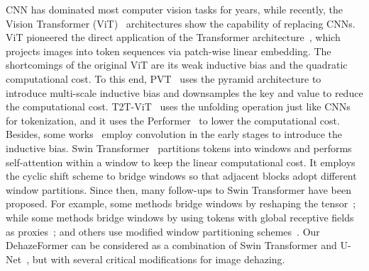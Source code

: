 \documentclass[journal]{IEEEtran}
\begin{document}
CNN has dominated most computer vision tasks for years, while recently, the Vision Transformer (ViT)~\cite{dosovitskiy2020image} architectures show the capability of replacing CNNs.
ViT pioneered the direct application of the Transformer architecture~\cite{vaswani2017attention}, which projects images into token sequences via patch-wise linear embedding.
The shortcomings of the original ViT are its weak inductive bias and the quadratic computational cost.
To this end, PVT~\cite{wang2021pyramid} uses the pyramid architecture to introduce multi-scale inductive bias and downsamples the key and value to reduce the computational cost.
T2T-ViT~\cite{yuan2021tokens} uses the unfolding operation just like CNNs for tokenization, and it uses the Performer~\cite{choromanski2020rethinking} to lower the computational cost.
Besides, some works~\cite{xiao2021early,dai2021coatnet,li2022uniformer,park2022vision} employ convolution in the early stages to introduce the inductive bias.
Swin Transformer~\cite{liu2021swin} partitions tokens into windows and performs self-attention within a window to keep the linear computational cost.
It employs the cyclic shift scheme to bridge windows so that adjacent blocks adopt different window partitions.
Since then, many follow-ups to Swin Transformer have been proposed.
For example, some methods bridge windows by reshaping the tensor~\cite{huang2021shuffle,yu2021glance,wang2021crossformer,lin2021cat}; while some methods bridge windows by using tokens with global receptive fields as proxies~\cite{chen2021regionvit,chen2021crossvit,chu2021twins}; and others use modified window partitioning schemes~\cite{dong2021cswin,wu2021pale,yang2021focal}.
Our DehazeFormer can be considered as a combination of Swin Transformer and U-Net~\cite{ronneberger2015u}, but with several critical modifications for image dehazing.
\end{document}
